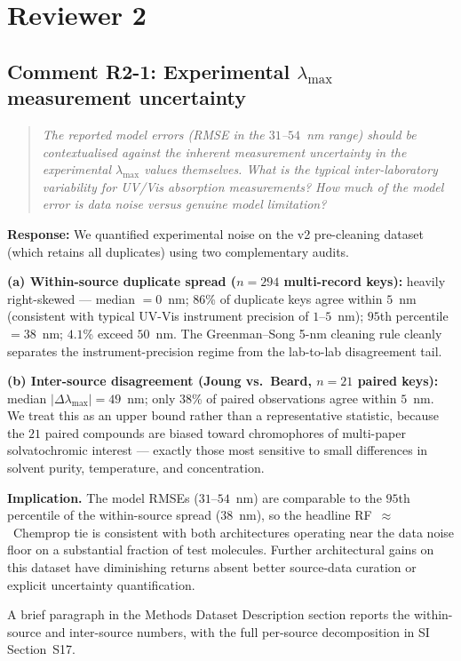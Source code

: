 \documentclass[11pt]{article}
\newenvironment{reviewer}{%
  \begin{quote}\itshape\color{black!70}}{%
  \end{quote}}
\newcommand{\response}[1]{\noindent\textbf{Response:} #1\par\medskip}
\begin{document}
\section*{Reviewer 2}

\subsection*{Comment R2-1: Experimental $\lambda_{\max}$ measurement uncertainty}
\begin{reviewer}
The reported model errors (RMSE in the $31$--$54$~nm range) should be contextualised against the inherent measurement uncertainty in the experimental $\lambda_{\max}$ values themselves. What is the typical inter-laboratory variability for UV/Vis absorption measurements? How much of the model error is data noise versus genuine model limitation?
\end{reviewer}

\response{We quantified experimental noise on the v2 pre-cleaning dataset (which retains all duplicates) using two complementary audits.

\textbf{(a) Within-source duplicate spread ($n = 294$ multi-record keys):} heavily right-skewed --- median $= 0$~nm; $86$\% of duplicate keys agree within $5$~nm (consistent with typical UV-Vis instrument precision of $1$--$5$~nm); $95$th percentile $= 38$~nm; $4.1$\% exceed $50$~nm. The Greenman--Song 5-nm cleaning rule cleanly separates the instrument-precision regime from the lab-to-lab disagreement tail.

\textbf{(b) Inter-source disagreement (Joung vs.\ Beard, $n = 21$ paired keys):} median $|\Delta\lambda_{\max}| = 49$~nm; only $38$\% of paired observations agree within $5$~nm. We treat this as an upper bound rather than a representative statistic, because the $21$ paired compounds are biased toward chromophores of multi-paper solvatochromic interest --- exactly those most sensitive to small differences in solvent purity, temperature, and concentration.

\textbf{Implication.} The model RMSEs ($31$--$54$~nm) are comparable to the $95$th percentile of the within-source spread ($38$~nm), so the headline RF~$\approx$~Chemprop tie is consistent with both architectures operating near the data noise floor on a substantial fraction of test molecules. Further architectural gains on this dataset have diminishing returns absent better source-data curation or explicit uncertainty quantification.

A brief paragraph in the Methods Dataset Description section reports the within-source and inter-source numbers, with the full per-source decomposition in SI Section~S17.}
\end{document}
